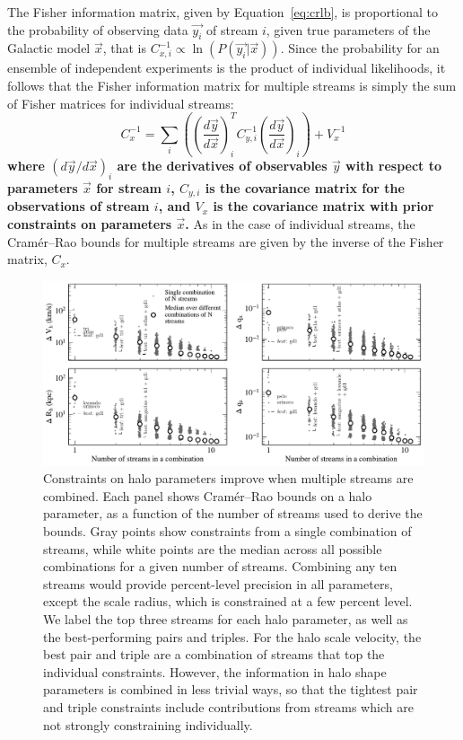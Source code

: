 \documentclass[modern]{aastex62}
\begin{document}
The Fisher information matrix, given by Equation~\ref{eq:crlb}, is proportional to the probability of observing data $\vec{y_i}$ of stream $i$, given true parameters of the Galactic model $\vec{x}$, that is $C_{x,i}^{-1}\propto \ln(P(\vec{y_i}|\vec{x}))$.
Since the probability for an ensemble of independent experiments is the product of individual likelihoods, it follows that the Fisher information matrix for multiple streams is simply the sum of Fisher matrices for individual streams:
\begin{equation}
C_x^{-1} = \sum_{i} \left( \left(\frac{d\vec{y}}{d\vec{x}}\right)_i^{T} C_{y,i}^{-1} \left(\frac{d\vec{y}}{d\vec{x}}\right)_i \right) + V_x^{-1}
\end{equation}
{\bf where $(d\vec{y}/d\vec{x})_i$ are the derivatives of observables $\vec{y}$ with respect to parameters $\vec{x}$ for stream $i$, $C_{y,i}$ is the covariance matrix for the observations of stream $i$, and $V_x$ is the covariance matrix with prior constraints on parameters $\vec{x}$.}
As in the case of individual streams, the Cram\' er--Rao bounds for multiple streams are given by the inverse of the Fisher matrix, $C_x$.

\begin{figure}
\begin{center}
\includegraphics[width=\textwidth]{nstream_improvement.pdf}
\caption{Constraints on halo parameters improve when multiple streams are combined.
Each panel shows Cram\'er--Rao bounds on a halo parameter, as a function of the number of streams used to derive the bounds.
Gray points show constraints from a single combination of streams, while white points are the median across all possible combinations for a given number of streams.
Combining any ten streams would provide percent-level precision in all parameters, except the scale radius, which is constrained at a few percent level.
We label the top three streams for each halo parameter, as well as the best-performing pairs and triples.
For the halo scale velocity, the best pair and triple are a combination of streams that top the individual constraints.
However, the information in halo shape parameters is combined in less trivial ways, so that the tightest pair and triple constraints include contributions from streams which are not strongly constraining individually.
}
\label{fig:nstream_summary}
\end{center}
\end{figure}
\end{document}
